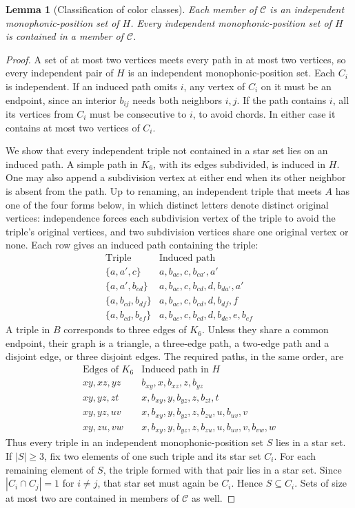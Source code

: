 \documentclass[11pt]{article}
\newtheorem{lemma}[theorem]{Lemma}
\theoremstyle{remark}
\begin{document}
\begin{lemma}[Classification of color classes]\label{lem:catalog}
Each member of $\mathcal C$ is an independent monophonic-position set of
$H$. Every independent monophonic-position set of $H$ is contained in a
member of $\mathcal C$.
\end{lemma}
\begin{proof}
A set of at most two vertices meets every path in at most two vertices,
so every independent pair of $H$ is an independent monophonic-position
set. Each $C_i$ is independent. If an induced path omits $i$, any vertex
of $C_i$ on it must be an endpoint, since an interior $b_{ij}$ needs both
neighbors $i,j$. If the path contains $i$, all its vertices from $C_i$
must be consecutive to $i$, to avoid chords. In either case it contains
at most two vertices of $C_i$.

We show that every independent triple not contained in a star set lies
on an induced path. A simple path in $K_6$, with its edges subdivided,
is induced in $H$. One may also append a subdivision vertex at either
end when its other neighbor is absent from the path. Up to renaming, an
independent triple that meets $A$ has one of the four forms below, in
which distinct letters denote distinct original vertices: independence
forces each subdivision vertex of the triple to avoid the triple's
original vertices, and two subdivision vertices share one original
vertex or none. Each row gives an induced path containing the triple:
\[
\begin{array}{c|l}
\text{Triple} & \text{Induced path} \\\hline
\{a,a',c\} & a,b_{ac},c,b_{ca'},a' \\
\{a,a',b_{cd}\} & a,b_{ac},c,b_{cd},d,b_{da'},a' \\
\{a,b_{cd},b_{df}\} & a,b_{ac},c,b_{cd},d,b_{df},f \\
\{a,b_{cd},b_{ef}\} & a,b_{ac},c,b_{cd},d,b_{de},e,b_{ef}
\end{array}
\]
A triple in $B$ corresponds to three edges of $K_6$. Unless they share
a common endpoint, their graph is a triangle, a three-edge path, a
two-edge path and a disjoint edge, or three disjoint edges. The required
paths, in the same order, are
\[
\begin{array}{c|l}
\text{Edges of }K_6 & \text{Induced path in }H \\\hline
xy,xz,yz & b_{xy},x,b_{xz},z,b_{yz} \\
xy,yz,zt & x,b_{xy},y,b_{yz},z,b_{zt},t \\
xy,yz,uv & x,b_{xy},y,b_{yz},z,b_{zu},u,b_{uv},v \\
xy,zu,vw & x,b_{xy},y,b_{yz},z,b_{zu},u,b_{uv},v,b_{vw},w
\end{array}
\]
Thus every triple in an independent monophonic-position set $S$ lies
in a star set. If $|S|\geq3$, fix two elements of one such triple and
its star set $C_i$. For each remaining element of $S$, the triple formed
with that pair lies in a star set. Since $|C_i\cap C_j|=1$ for $i\ne j$,
that star set must again be $C_i$. Hence $S\subseteq C_i$. Sets of size
at most two are contained in members of $\mathcal C$ as well.
\end{proof}
\end{document}
